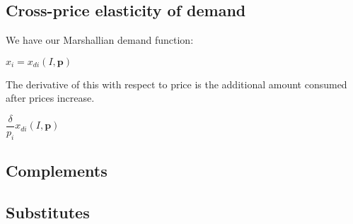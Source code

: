 
\subsection{Cross-price elasticity of demand}

We have our Marshallian demand function:

\(x_i=x_{di}(I, \mathbf p)\)

The derivative of this with respect to price is the additional amount consumed after prices increase.

\(\dfrac{\delta }{p_i}x_{di}(I, \mathbf p)\)

\subsection{Complements}

\subsection{Substitutes}
